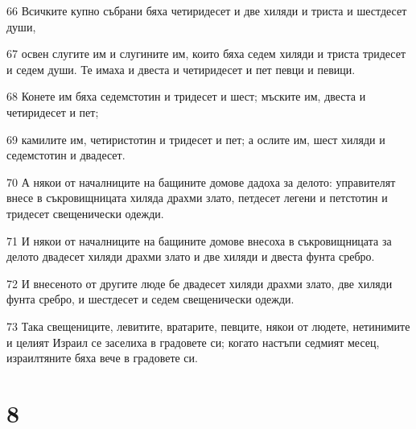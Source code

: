 \par 66 Всичките купно събрани бяха четиридесет и две хиляди и триста и шестдесет души,
\par 67 освен слугите им и слугините им, които бяха седем хиляди и триста тридесет и седем души. Те имаха и двеста и четиридесет и пет певци и певици.
\par 68 Конете им бяха седемстотин и тридесет и шест; мъските им, двеста и четиридесет и пет;
\par 69 камилите им, четиристотин и тридесет и пет; а ослите им, шест хиляди и седемстотин и двадесет.
\par 70 А някои от началниците на бащините домове дадоха за делото: управителят внесе в съкровищницата хиляда драхми злато, петдесет легени и петстотин и тридесет свещенически одежди.
\par 71 И някои от началниците на бащините домове внесоха в съкровищницата за делото двадесет хиляди драхми злато и две хиляди и двеста фунта сребро.
\par 72 И внесеното от другите люде бе двадесет хиляди драхми злато, две хиляди фунта сребро, и шестдесет и седем свещенически одежди.
\par 73 Така свещениците, левитите, вратарите, певците, някои от людете, нетинимите и целият Израил се заселиха в градовете си; когато настъпи седмият месец, израилтяните бяха вече в градовете си.

\chapter{8}

